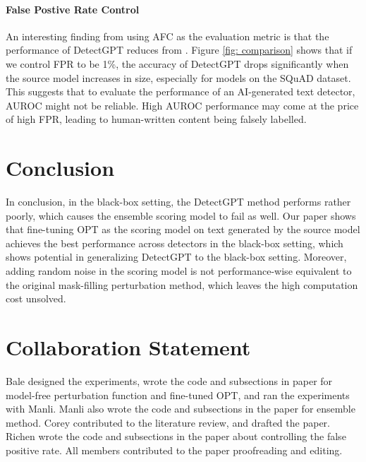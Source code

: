 \documentclass[11pt]{article}
\begin{document}
\paragraph{False Postive Rate Control} An interesting finding from using AFC as the evaluation metric is that the performance of DetectGPT reduces from \citet{detectgpt}. Figure \ref{fig: comparison} shows that if we control FPR to be 1\%, the accuracy of DetectGPT drops significantly when the source model increases in size, especially for models on the SQuAD dataset. This suggests that to evaluate the performance of an AI-generated text detector, AUROC might not be reliable. High AUROC performance may come at the price of high FPR, leading to human-written content being falsely labelled.

\section{Conclusion}
In conclusion, in the black-box setting, the DetectGPT method performs rather poorly, which causes the ensemble scoring model to fail as well. Our paper shows that fine-tuning OPT as the scoring model on text generated by the source model achieves the best performance across detectors in the black-box setting, which shows potential in generalizing DetectGPT to the black-box setting. Moreover, adding random noise in the scoring model is not performance-wise equivalent to the original mask-filling perturbation method, which leaves the high computation cost unsolved.

\newpage




\section*{Collaboration Statement}
Bale designed the experiments, wrote the code and subsections in paper for model-free perturbation function and fine-tuned OPT, and ran the experiments with Manli. Manli also wrote the code and subsections in the paper for ensemble method. Corey contributed to the literature review, and drafted the paper. Richen wrote the code and subsections in the paper about controlling the false positive rate. All members contributed to the paper proofreading and editing. 
\end{document}
